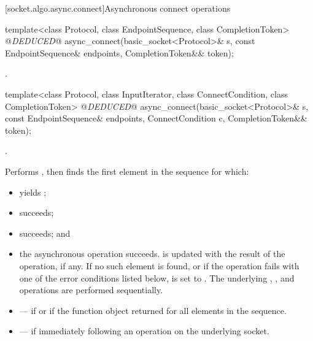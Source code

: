 [socket.algo.async.connect]{Asynchronous connect operations}

\begin{itemdecl}
template<class Protocol, class EndpointSequence, class CompletionToken>
  @\textit{DEDUCED}@ async_connect(basic_socket<Protocol>& s,
                        const EndpointSequence& endpoints,
                        CompletionToken&& token);
\end{itemdecl}

\begin{itemdescr}
\pnum
\returns {}.
\end{itemdescr}

\begin{itemdecl}
template<class Protocol, class InputIterator,
  class ConnectCondition, class CompletionToken>
    @\textit{DEDUCED}@ async_connect(basic_socket<Protocol>& s,
                          const EndpointSequence& endpoints,
                          ConnectCondition c,
                          CompletionToken&& token);
\end{itemdecl}

\begin{itemdescr}
\pnum
\completionsig {}.

\pnum
\effects Performs , then finds the first element  in the sequence  for which:
\begin{itemize}
\item
{} yields ;
\item
{} succeeds;
\item
{} succeeds; and
\item
 the asynchronous operation succeeds. is updated with the result of the  operation, if any. If no such element is found, or if the operation fails with one of the error conditions listed below,  is set to . \enternote The underlying , , and  operations are performed sequentially. \exitnote
\end{itemize}

\pnum
\errors
\begin{itemize}
\item
{} --- if  or if the function object  returned  for all elements in the sequence.
\item
{} --- if  immediately following an  operation on the underlying socket.
\end{itemize}
\end{itemdescr}

